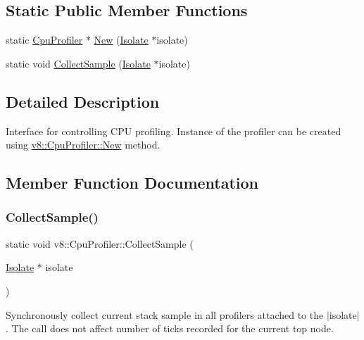 \subsection*{Static Public Member Functions}
\begin{DoxyCompactItemize}
\item 
static \mbox{\hyperlink{classv8_1_1CpuProfiler}{Cpu\+Profiler}} $\ast$ \mbox{\hyperlink{classv8_1_1CpuProfiler_a9850aa42c5580c686cde1555f09577aa}{New}} (\mbox{\hyperlink{classv8_1_1Isolate}{Isolate}} $\ast$isolate)
\item 
static void \mbox{\hyperlink{classv8_1_1CpuProfiler_a88b787078f0c8742b3c077af0de4f46b}{Collect\+Sample}} (\mbox{\hyperlink{classv8_1_1Isolate}{Isolate}} $\ast$isolate)
\end{DoxyCompactItemize}


\subsection{Detailed Description}
Interface for controlling C\+PU profiling. Instance of the profiler can be created using \mbox{\hyperlink{classv8_1_1CpuProfiler_a9850aa42c5580c686cde1555f09577aa}{v8\+::\+Cpu\+Profiler\+::\+New}} method. 

\subsection{Member Function Documentation}
\mbox{\label{classv8_1_1CpuProfiler_a88b787078f0c8742b3c077af0de4f46b}} 
\subsubsection{\texorpdfstring{Collect\+Sample()}{CollectSample()}}
{\footnotesize\ttfamily static void v8\+::\+Cpu\+Profiler\+::\+Collect\+Sample (\begin{DoxyParamCaption}\item[{\mbox{\hyperlink{classv8_1_1Isolate}{Isolate}} $\ast$}]{isolate }\end{DoxyParamCaption})\hspace{0.3cm}{\ttfamily [static]}}

Synchronously collect current stack sample in all profilers attached to the $\vert$isolate$\vert$. The call does not affect number of ticks recorded for the current top node. \mbox{\label{classv8_1_1CpuProfiler_ab49b3f25a897dc6a359571b3014cd225}} 
